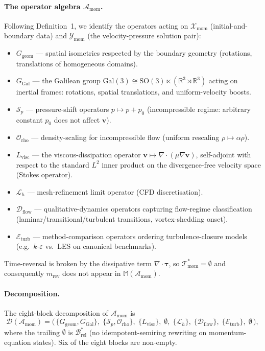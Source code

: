\paragraph{The operator algebra $\mathcal{A}_{\mathrm{mom}}$.}
Following Definition~1, we identify the operators acting on $\mathcal{X}_{\mathrm{mom}}$ (initial-and-boundary data) and $\mathcal{Y}_{\mathrm{mom}}$ (the velocity-pressure solution pair):
\begin{itemize}
    \item $G_{\mathrm{geom}}$ --- spatial isometries respected by the boundary geometry (rotations, translations of homogeneous domains).
    \item $G_{\mathrm{Gal}}$ --- the Galilean group $\mathrm{Gal}(3) \cong \mathrm{SO}(3) \ltimes (\mathbb{R}^3 \rtimes \mathbb{R}^3)$ acting on inertial frames: rotations, spatial translations, and uniform-velocity boosts.
    \item $\mathcal{S}_p$ --- pressure-shift operators $p \mapsto p + p_0$ (incompressible regime: arbitrary constant $p_0$ does not affect $\mathbf{v}$).
    \item $\mathcal{O}_{\mathrm{rho}}$ --- density-scaling for incompressible flow (uniform rescaling $\rho \mapsto \alpha\rho$).
    \item $L_{\mathrm{visc}}$ --- the viscous-dissipation operator $\mathbf{v} \mapsto \nabla\!\cdot\!(\mu \nabla \mathbf{v})$, self-adjoint with respect to the standard $L^2$ inner product on the divergence-free velocity space (Stokes operator).
    \item $\mathcal{L}_h$ --- mesh-refinement limit operator (CFD discretisation).
    \item $\mathcal{D}_{\mathrm{flow}}$ --- qualitative-dynamics operators capturing flow-regime classification (laminar/transitional/turbulent transitions, vortex-shedding onset).
    \item $\mathcal{E}_{\mathrm{turb}}$ --- method-comparison operators ordering turbulence-closure models (e.g.\ $k$-$\varepsilon$ vs.\ LES on canonical benchmarks).
\end{itemize}
Time-reversal is broken by the dissipative term $\nabla\!\cdot\!\boldsymbol{\tau}$, so $\mathcal{T}^{*}_{\mathrm{mom}} = \emptyset$ and consequently $m_{\mathrm{rev}}$ does not appear in $\mathbb{M}(\mathcal{A}_{\mathrm{mom}})$.

\paragraph{Decomposition.} The eight-block decomposition of $\mathcal{A}_{\mathrm{mom}}$ is
$$
\mathcal{D}(\mathcal{A}_{\mathrm{mom}}) = \bigl(\,\{G_{\mathrm{geom}}, G_{\mathrm{Gal}}\},\; \{\mathcal{S}_p, \mathcal{O}_{\mathrm{rho}}\},\; \{L_{\mathrm{visc}}\},\; \emptyset,\; \{\mathcal{L}_h\},\; \{\mathcal{D}_{\mathrm{flow}}\},\; \{\mathcal{E}_{\mathrm{turb}}\},\; \emptyset\,\bigr),
$$
where the trailing $\emptyset$ is $\mathcal{B}^{*}_{\mathrm{rel}}$ (no idempotent-semiring rewriting on momentum-equation states). Six of the eight blocks are non-empty.

